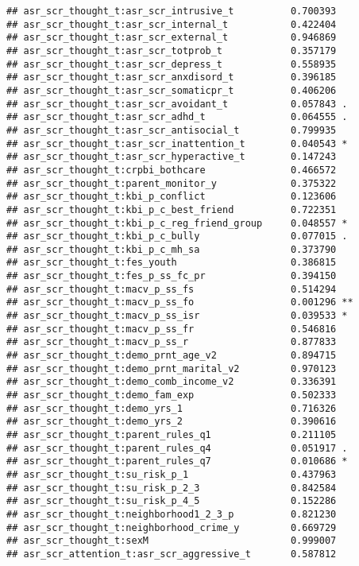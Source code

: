 \documentclass[
]{article}
\begin{document}
\begin{verbatim}
## asr_scr_thought_t:asr_scr_intrusive_t          0.700393    
## asr_scr_thought_t:asr_scr_internal_t           0.422404    
## asr_scr_thought_t:asr_scr_external_t           0.946869    
## asr_scr_thought_t:asr_scr_totprob_t            0.357179    
## asr_scr_thought_t:asr_scr_depress_t            0.558935    
## asr_scr_thought_t:asr_scr_anxdisord_t          0.396185    
## asr_scr_thought_t:asr_scr_somaticpr_t          0.406206    
## asr_scr_thought_t:asr_scr_avoidant_t           0.057843 .  
## asr_scr_thought_t:asr_scr_adhd_t               0.064555 .  
## asr_scr_thought_t:asr_scr_antisocial_t         0.799935    
## asr_scr_thought_t:asr_scr_inattention_t        0.040543 *  
## asr_scr_thought_t:asr_scr_hyperactive_t        0.147243    
## asr_scr_thought_t:crpbi_bothcare               0.466572    
## asr_scr_thought_t:parent_monitor_y             0.375322    
## asr_scr_thought_t:kbi_p_conflict               0.123606    
## asr_scr_thought_t:kbi_p_c_best_friend          0.722351    
## asr_scr_thought_t:kbi_p_c_reg_friend_group     0.048557 *  
## asr_scr_thought_t:kbi_p_c_bully                0.077015 .  
## asr_scr_thought_t:kbi_p_c_mh_sa                0.373790    
## asr_scr_thought_t:fes_youth                    0.386815    
## asr_scr_thought_t:fes_p_ss_fc_pr               0.394150    
## asr_scr_thought_t:macv_p_ss_fs                 0.514294    
## asr_scr_thought_t:macv_p_ss_fo                 0.001296 ** 
## asr_scr_thought_t:macv_p_ss_isr                0.039533 *  
## asr_scr_thought_t:macv_p_ss_fr                 0.546816    
## asr_scr_thought_t:macv_p_ss_r                  0.877833    
## asr_scr_thought_t:demo_prnt_age_v2             0.894715    
## asr_scr_thought_t:demo_prnt_marital_v2         0.970123    
## asr_scr_thought_t:demo_comb_income_v2          0.336391    
## asr_scr_thought_t:demo_fam_exp                 0.502333    
## asr_scr_thought_t:demo_yrs_1                   0.716326    
## asr_scr_thought_t:demo_yrs_2                   0.390616    
## asr_scr_thought_t:parent_rules_q1              0.211105    
## asr_scr_thought_t:parent_rules_q4              0.051917 .  
## asr_scr_thought_t:parent_rules_q7              0.010686 *  
## asr_scr_thought_t:su_risk_p_1                  0.437963    
## asr_scr_thought_t:su_risk_p_2_3                0.842584    
## asr_scr_thought_t:su_risk_p_4_5                0.152286    
## asr_scr_thought_t:neighborhood1_2_3_p          0.821230    
## asr_scr_thought_t:neighborhood_crime_y         0.669729    
## asr_scr_thought_t:sexM                         0.999007    
## asr_scr_attention_t:asr_scr_aggressive_t       0.587812    

\end{verbatim}
\end{document}
